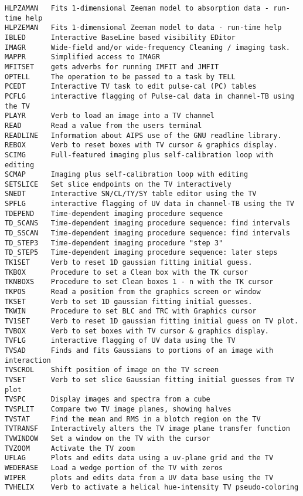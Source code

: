 \begin{verbatim}
HLPZAMAN   Fits 1-dimensional Zeeman model to absorption data - run-time help
HLPZEMAN   Fits 1-dimensional Zeeman model to data - run-time help
IBLED      Interactive BaseLine based visibility EDitor
IMAGR      Wide-field and/or wide-frequency Cleaning / imaging task.
MAPPR      Simplified access to IMAGR
MFITSET    gets adverbs for running IMFIT and JMFIT
OPTELL     The operation to be passed to a task by TELL
PCEDT      Interactive TV task to edit pulse-cal (PC) tables
PCFLG      interactive flagging of Pulse-cal data in channel-TB using the TV
PLAYR      Verb to load an image into a TV channel
READ       Read a value from the users terminal
READLINE   Information about AIPS use of the GNU readline library.
REBOX      Verb to reset boxes with TV cursor & graphics display.
SCIMG      Full-featured imaging plus self-calibration loop with editing
SCMAP      Imaging plus self-calibration loop with editing
SETSLICE   Set slice endpoints on the TV interactively
SNEDT      Interactive SN/CL/TY/SY table editor using the TV
SPFLG      interactive flagging of UV data in channel-TB using the TV
TDEPEND    Time-dependent imaging procedure sequence
TD_SCANS   Time-dependent imaging procedure sequence: find intervals
TD_SSCAN   Time-dependent imaging procedure sequence: find intervals
TD_STEP3   Time-dependent imaging procedure "step 3"
TD_STEP5   Time-dependent imaging procedure sequence: later steps
TK1SET     Verb to reset 1D gaussian fitting initial guess.
TKBOX      Procedure to set a Clean box with the TK cursor
TKNBOXS    Procedure to set Clean boxes 1 - n with the TK cursor
TKPOS      Read a position from the graphics screen or window
TKSET      Verb to set 1D gaussian fitting initial guesses.
TKWIN      Procedure to set BLC and TRC with Graphics cursor
TV1SET     Verb to reset 1D gaussian fitting initial guess on TV plot.
TVBOX      Verb to set boxes with TV cursor & graphics display.
TVFLG      interactive flagging of UV data using the TV
TVSAD      Finds and fits Gaussians to portions of an image with interaction
TVSCROL    Shift position of image on the TV screen
TVSET      Verb to set slice Gaussian fitting initial guesses from TV plot
TVSPC      Display images and spectra from a cube
TVSPLIT    Compare two TV image planes, showing halves
TVSTAT     Find the mean and RMS in a blotch region on the TV
TVTRANSF   Interactively alters the TV image plane transfer function
TVWINDOW   Set a window on the TV with the cursor
TVZOOM     Activate the TV zoom
UFLAG      Plots and edits data using a uv-plane grid and the TV
WEDERASE   Load a wedge portion of the TV with zeros
WIPER      plots and edits data from a UV data base using the TV
TVHELIX    Verb to activate a helical hue-intensity TV pseudo-coloring
\end{verbatim}\eve

